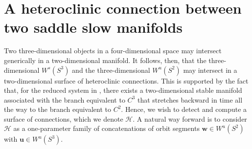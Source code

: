 \documentclass{ws-ijbc}
\begin{document}
\section{A heteroclinic connection between two saddle slow manifolds}
\label{sec:hetconn}

Two three-dimensional objects in a four-dimensional space may intersect generically in a two-dimensional manifold.  It follows, then, that the three-dimensional $W^s(S^3)$ and the three-dimensional $W^u(S^2)$ may intersect in a two-dimensional surface of heteroclinic connections.  This is supported by the fact that, for the reduced system in \cite{QSSA}, there exists a two-dimensional stable manifold associated with the branch equivalent to $C^3$ that stretches backward in time all the way to the branch equivalent to $C^2$.  Hence, we wish to detect and compute a surface of connections, which we denote $\mathscr{H}$.  A natural way forward is to consider $\mathscr{H}$ as a one-parameter family of concatenations of orbit segments $\mathbf{w} \in W^u(S^2)$ with $\mathbf{u} \in W^u(S^3)$.
\end{document}
